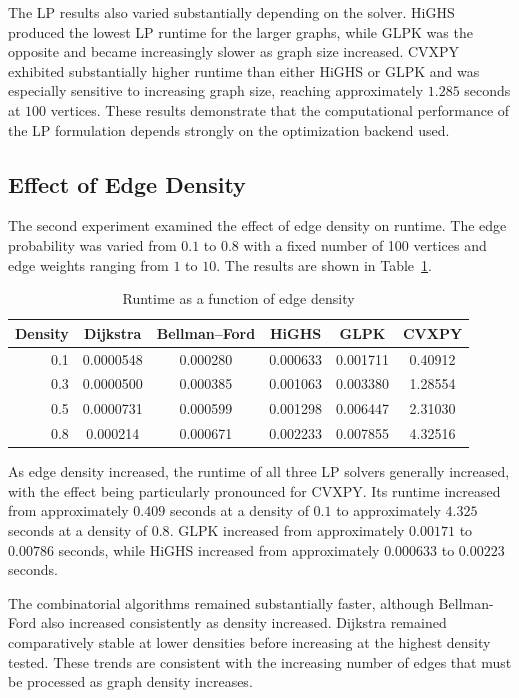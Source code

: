 \documentclass[12pt]{report}
\begin{document}
The LP results also varied substantially depending on the solver. HiGHS produced the lowest LP runtime for the larger graphs, while GLPK was the opposite and became increasingly slower as graph size increased. CVXPY exhibited substantially higher runtime than either HiGHS or GLPK and was especially sensitive to increasing graph size, reaching approximately $1.285$ seconds at $100$ vertices. These results demonstrate that the computational performance of the LP formulation depends strongly on the optimization backend used.

\subsection{Effect of Edge Density}

The second experiment examined the effect of edge density on runtime. The edge probability was varied from $0.1$ to $0.8$ with a fixed number of 100 vertices and edge weights ranging from $1$ to $10$. The results are shown in Table~\ref{tab:density_runtime}.

\begin{table}[H]
\centering
\caption{Runtime as a function of edge density}
\label{tab:density_runtime}
\begin{tabular}{rccccc}
\hline
\textbf{Density} & \textbf{Dijkstra} & \textbf{Bellman--Ford} &
\textbf{HiGHS} & \textbf{GLPK} & \textbf{CVXPY} \\
\hline
0.1 & 0.0000548 & 0.000280 & 0.000633 & 0.001711 & 0.40912 \\
0.3 & 0.0000500 & 0.000385 & 0.001063 & 0.003380 & 1.28554 \\
0.5 & 0.0000731 & 0.000599 & 0.001298 & 0.006447 & 2.31030 \\
0.8 & 0.000214  & 0.000671 & 0.002233 & 0.007855 & 4.32516 \\
\hline
\end{tabular}
\end{table}

As edge density increased, the runtime of all three LP solvers generally increased, with the effect being particularly pronounced for CVXPY. Its runtime increased from approximately $0.409$ seconds at a density of $0.1$ to approximately $4.325$ seconds at a density of $0.8$. GLPK increased from approximately $0.00171$ to $0.00786$ seconds, while HiGHS increased from approximately $0.000633$ to $0.00223$ seconds.

The combinatorial algorithms remained substantially faster, although Bellman-Ford also increased consistently as density increased. Dijkstra remained comparatively stable at lower densities before increasing at the highest density tested. These trends are consistent with the increasing number of edges that must be processed as graph density increases. 
\end{document}
